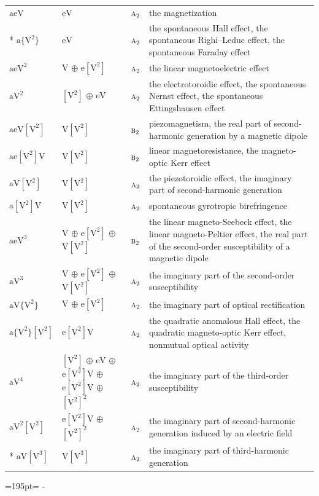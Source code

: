 \documentclass[10pt,a4paper]{article}
\newcommand{\needspace}[1]{\par\penalty-100\begingroup\dimen0=#1\relax\dimen2=\pagegoal
  \advance\dimen2-\pagetotal\ifdim\dimen0>\dimen2\relax\ifdim\dimen2>0pt\vfil\break\fi\fi
  \endgroup}
\numberwithin{equation}{section}
\newcommand{\irr}[1]{\text{\normalfont\scshape #1}}
\newcommand{\jahn}[1]{\mathrm{#1}}
\newlength{\fillwidth}\newlength{\cellwidth}\newlength{\colwidth}
\begin{document}
{\begin{longtable}{@{}lll>{\RaggedRight\arraybackslash}p{\fillwidth}@{}}
\bottomrule\endfoot\endlastfoot
$\jahn{aeV}$ & $\jahn{eV}$ & $\irr{a}_{2}$ & the magnetization\\*
$\jahn{a\{V^{2}\}}$ & $\jahn{eV}$ & $\irr{a}_{2}$ & the spontaneous Hall effect, the spontaneous Righi–Leduc effect, the spontaneous Faraday effect\\
$\jahn{aeV^{2}}$ & $\jahn{V}$ $\oplus$ $\jahn{e[V^{2}]}$ & $\irr{a}_{2}$ & the linear magnetoelectric effect\\
$\jahn{aV^{2}}$ & $\jahn{[V^{2}]}$ $\oplus$ $\jahn{eV}$ & $\irr{a}_{2}$ & the electrotoroidic effect, the spontaneous Nernst effect, the spontaneous Ettingshausen effect\\
$\jahn{aeV[V^{2}]}$ & $\jahn{V[V^{2}]}$ & $\irr{b}_{2}$ & piezomagnetism, the real part of second-harmonic generation by a magnetic dipole\\
$\jahn{ae[V^{2}]V}$ & $\jahn{V[V^{2}]}$ & $\irr{b}_{2}$ & linear magnetoresistance, the magneto-optic Kerr effect\\
$\jahn{aV[V^{2}]}$ & $\jahn{V[V^{2}]}$ & $\irr{a}_{2}$ & the piezotoroidic effect, the imaginary part of second-harmonic generation\\
$\jahn{a[V^{2}]V}$ & $\jahn{V[V^{2}]}$ & $\irr{a}_{2}$ & spontaneous gyrotropic birefringence\\
$\jahn{aeV^{3}}$ & $\jahn{V}$ $\oplus$ $\jahn{e[V^{2}]}$ $\oplus$ $\jahn{V[V^{2}]}$ & $\irr{b}_{2}$ & the linear magneto-Seebeck effect, the linear magneto-Peltier effect, the real part of the second-order susceptibility of a magnetic dipole\\
$\jahn{aV^{3}}$ & $\jahn{V}$ $\oplus$ $\jahn{e[V^{2}]}$ $\oplus$ $\jahn{V[V^{2}]}$ & $\irr{a}_{2}$ & the imaginary part of the second-order susceptibility\\
$\jahn{aV\{V^{2}\}}$ & $\jahn{V}$ $\oplus$ $\jahn{e[V^{2}]}$ & $\irr{a}_{2}$ & the imaginary part of optical rectification\\
$\jahn{a\{V^{2}\}[V^{2}]}$ & $\jahn{e[V^{2}]V}$ & $\irr{a}_{2}$ & the quadratic anomalous Hall effect, the quadratic magneto-optic Kerr effect, nonmutual optical activity\\
$\jahn{aV^{4}}$ & $\jahn{[V^{2}]}$ $\oplus$ $\jahn{eV}$ $\oplus$ $\jahn{e[V^{2}]V}$ $\oplus$ $\jahn{e[V^{2}]V}$ $\oplus$ $\jahn{[V^{2}]^{2}}$ & $\irr{a}_{2}$ & the imaginary part of the third-order susceptibility\\
$\jahn{aV^{2}[V^{2}]}$ & $\jahn{e[V^{2}]V}$ $\oplus$ $\jahn{[V^{2}]^{2}}$ & $\irr{a}_{2}$ & the imaginary part of second-harmonic generation induced by an electric field\\*
$\jahn{aV[V^{3}]}$ & $\jahn{V[V^{3}]}$ & $\irr{a}_{2}$ & the imaginary part of third-harmonic generation\\
\bottomrule\end{longtable}}
\needspace{195pt}
\end{document}
